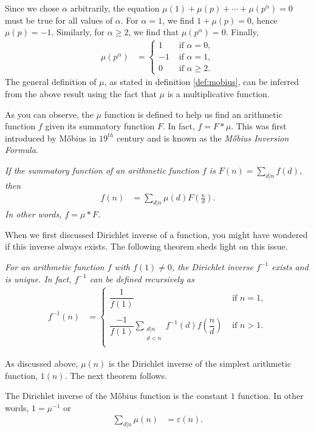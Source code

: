 \documentclass[12pt]{subfile}
\begin{document}
	Since we chose $\alpha$ arbitrarily, the equation $\mu(1) + \mu(p) + \cdots + \mu(p^\alpha)=0$ must be true for all values of $\alpha$. For $\alpha=1$, we find $1 + \mu(p) = 0$, hence $\mu(p)=-1$. Similarly, for $\alpha\geq 2$, we find that $\mu(p^\alpha)=0$. Finally,
		\begin{align*}
			\mu(p^\alpha) & = \begin{cases}
			1&\mbox{ if }\alpha=0,\\
			-1&\mbox{ if }\alpha=1,\\
			0&\mbox{ if }\alpha\geq 2.
			\end{cases}
		\end{align*}
	The general definition of $\mu$, as stated in definition \eqref{def:mobius}, can be inferred from the above result using the fact that $\mu$ is a multiplicative function.
	
	As you can observe, the $\mu$ function is defined to help us find an arithmetic function $f$ given its summatory function $F$. In fact, $f=F \ast \mu$. This was first introduced by M\H obius in $19^{th}$ century and is known as the \textit{M\H obius Inversion Formula}.
			
		\begin{theorem}\slshape
			\label{thm:mobinv}
			If the summatory function of an arithmetic function $f$ is $\displaystyle F(n)=\sum\limits_{d|n}f(d)$, then
			\begin{align*}
			f(n) & =\sum_{d|n}\mu(d)F\left(\frac nd\right).
			\end{align*}
			In other words, $f=\mu\ast F$.
		\end{theorem}

		
	When we first discussed Dirichlet inverse of a function, you might have wondered if this inverse always exists. The following theorem sheds light on this issue.
	
		\begin{theorem}\slshape \label{thm:dirichletinverse}
			For an arithmetic function $f$ with $f(1)\neq0$, the Dirichlet inverse $f^{-1}$ exists and is unique. In fact, $f^{-1}$ can be defined recursively as
				\begin{align*}
				f^{-1}(n) & = \begin{cases}
				\dfrac1{f(1)}&\mbox{ if }n=1,\\ \\
				\displaystyle\dfrac{-1}{f(1)}\sum_{\substack{d|n\\d<n}}f^{-1}(d)f\left(\dfrac nd\right)&\mbox{ if }n>1.\\
				\end{cases}
		\end{align*}
		\end{theorem}
	As discussed above, $\mu(n)$ is the Dirichlet inverse of the simplest arithmetic function, $1(n)$. The next theorem follows.
		\begin{theorem}
			\label{thm:mobiusinverse}
			The Dirichlet inverse of the M\H obius function is the constant $1$ function. In other words, $1=\mu^{-1}$ or
			\begin{align*}
			\sum_{d|n}\mu(n) & =\varepsilon(n).
			\end{align*}
		\end{theorem}
		
\end{document}
